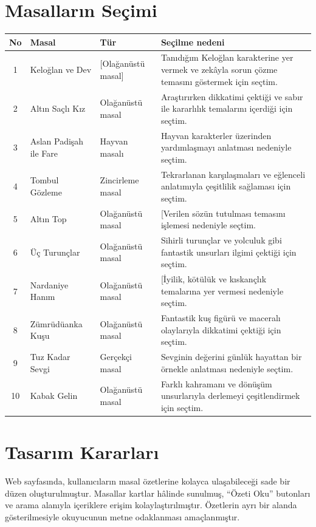 \documentclass[12pt,a4paper]{article}
\begin{document}
\section{Masalların Seçimi}
\begin{longtable}{@{}cp{4cm}p{3cm}p{5.4cm}@{}}
\toprule
\textbf{No} & \textbf{Masal} & \textbf{Tür} & \textbf{Seçilme nedeni} \\
\midrule
\endhead
1 & Keloğlan ve Dev & [Olağanüstü masal] & Tanıdığım Keloğlan karakterine yer vermek ve zekâyla sorun çözme temasını göstermek için seçtim.\\
2 & Altın Saçlı Kız & Olağanüstü masal & Araştırırken dikkatimi çektiği ve sabır ile kararlılık temalarını içerdiği için seçtim. \\
3 & Aslan Padişah ile Fare & Hayvan masalı & Hayvan karakterler üzerinden yardımlaşmayı anlatması nedeniyle seçtim. \\
4  & Tombul Gözleme & Zincirleme masal & Tekrarlanan karşılaşmaları ve eğlenceli anlatımıyla çeşitlilik sağlaması için seçtim. \\
5 & Altın Top & Olağanüstü masal & [Verilen sözün tutulması temasını işlemesi nedeniyle seçtim. \\
6 & Üç Turunçlar & Olağanüstü masal & Sihirli turunçlar ve yolculuk gibi fantastik unsurları ilgimi çektiği için seçtim. \\
7 & Nardaniye Hanım & Olağanüstü masal & [İyilik, kötülük ve kıskançlık temalarına yer vermesi nedeniyle seçtim. \\
8 & Zümrüdüanka Kuşu & Olağanüstü masal & Fantastik kuş figürü ve maceralı olaylarıyla dikkatimi çektiği için seçtim. \\
9 & Tuz Kadar Sevgi & Gerçekçi masal & Sevginin değerini günlük hayattan bir örnekle anlatması nedeniyle seçtim. \\
10 & Kabak Gelin & Olağanüstü masal &  Farklı kahramanı ve dönüşüm unsurlarıyla derlemeyi çeşitlendirmek için seçtim. \\
\bottomrule
\end{longtable}

\section{Tasarım Kararları}
Web sayfasında, kullanıcıların masal özetlerine kolayca ulaşabileceği sade bir düzen oluşturulmuştur. Masallar kartlar hâlinde sunulmuş, “Özeti Oku” butonları ve arama alanıyla içeriklere erişim kolaylaştırılmıştır. Özetlerin ayrı bir alanda gösterilmesiyle okuyucunun metne odaklanması amaçlanmıştır.
\end{document}
